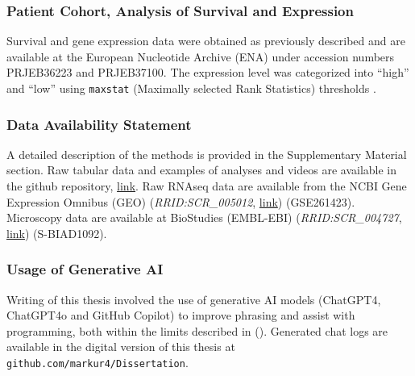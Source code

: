 \subsubsection*{Patient Cohort, Analysis of Survival and Expression}%
\label{C1:methods_patientcohort}%
Survival and gene expression data were obtained as previously described
\cite{seckingerTargetExpressionGeneration2017b, seckingerCD38ImmunotherapeuticTarget2018}
and are available at the European Nucleotide Archive (ENA) under accession
numbers PRJEB36223 and PRJEB37100. The expression level was categorized into
``high'' and ``low'' using \texttt{maxstat} (Maximally selected Rank Statistics)
thresholds \cite{hothornMaximallySelectedRank2017}.


\subsubsection*{Data Availability Statement}%
\label{C1:methods_dataavailability}%
A detailed description of the methods is provided in the Supplementary Material section. Raw
tabular data and examples of analyses and videos are available in the github repository, \href{https://github.com/markur4/Supplemental-INA-6-Subpopulations-and-Aggregation-Detachment-Dynamics}{link}.
Raw RNAseq data are available from the NCBI Gene Expression Omnibus (GEO)
(\textit{RRID:SCR\_005012}, \href{https://www.ncbi.nlm.nih.gov/geo/query/acc.cgi?acc=GSE261423}{link}) (GSE261423). Microscopy data are available at BioStudies
(EMBL-EBI) (\textit{RRID:SCR\_004727}, \href{https://www.ebi.ac.uk/biostudies/bioimages/studies/S-BIAD1092?key=69bafe9c-74ff-492b-9e68-bd42655c4d1b}{link}) (S-BIAD1092).


\subsubsection*{Usage of Generative AI}%
\label{C1:methods_generativeai}%
Writing of this thesis involved the use of generative AI models (ChatGPT4,
ChatGPT4o and GitHub Copilot) to improve phrasing and assist with programming,
both within the limits described in 
(). Generated chat logs are available in the digital
version of this thesis at \texttt{github.com/markur4/Dissertation}.

